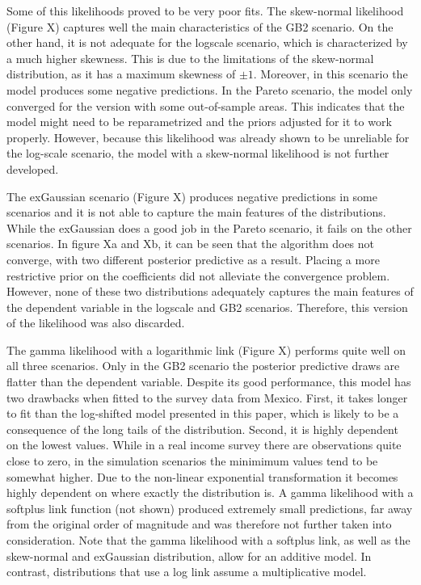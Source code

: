 Some of this likelihoods proved to be very poor fits.
The skew-normal likelihood (Figure X) captures well the main characteristics of the GB2 scenario. On the other hand, it is not adequate for the logscale scenario, which is characterized by a much higher skewness.
This is due to the limitations of the skew-normal distribution, as it has a maximum skewness of $\pm 1$.
Moreover, in this scenario the model produces some negative predictions.
In the Pareto scenario, the model only converged for the version with some out-of-sample areas.
This indicates that the model might need to be reparametrized and the priors adjusted for it to work properly.
However, because this likelihood was already shown to be unreliable for the log-scale scenario, the model with a skew-normal likelihood is not further developed.


The exGaussian scenario (Figure X) produces negative predictions in some scenarios and it is not able to capture the main features of the distributions.
While the exGaussian does a good job in the Pareto scenario, it fails on the other scenarios.
In figure Xa and Xb, it can be seen that the algorithm does not converge, with two different posterior predictive as a result.
Placing a more restrictive prior on the coefficients did not alleviate the convergence problem.
However, none of these two distributions adequately captures the main features of the dependent variable in the logscale and GB2 scenarios.
Therefore, this version of the likelihood was also discarded.


The gamma likelihood with a logarithmic link (Figure X) performs quite well on all three scenarios.
Only in the GB2 scenario the posterior predictive draws are flatter than the dependent variable.
Despite its good performance, this model has two drawbacks when fitted to the survey data from Mexico.
First, it takes longer to fit than the log-shifted model presented in this paper, which is likely to be a consequence of the long tails of the distribution.
Second, it is highly dependent on the lowest values.
While in a real income survey there are observations quite close to zero, in the simulation scenarios the minimimum values tend to be somewhat higher.
Due to the non-linear exponential transformation it becomes highly dependent on where exactly the distribution is.
A gamma likelihood with a softplus link function (not shown) produced extremely small predictions, far away from the original order of magnitude and was therefore not further taken into consideration.
Note that the gamma likelihood with a softplus link, as well as the skew-normal and exGaussian distribution, allow for an additive model.
In contrast, distributions that use a log link assume a multiplicative model.

